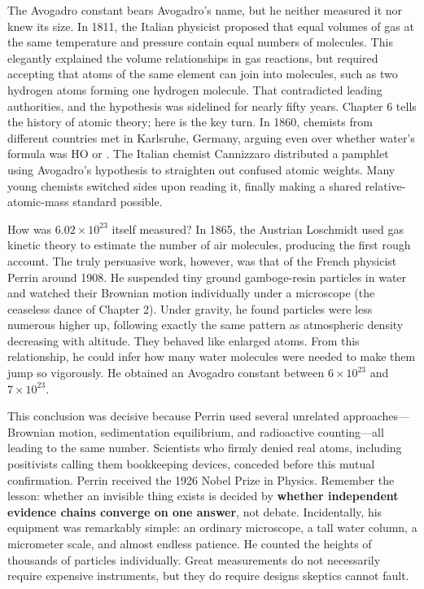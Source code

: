 \begin{zhengju}
The Avogadro constant bears Avogadro's name, but he neither measured it nor knew its size. In 1811, the Italian physicist proposed that equal volumes of gas at the same temperature and pressure contain equal numbers of molecules. This elegantly explained the volume relationships in gas reactions, but required accepting that atoms of the same element can join into molecules, such as two hydrogen atoms forming one hydrogen molecule. That contradicted leading authorities, and the hypothesis was sidelined for nearly fifty years. Chapter 6 tells the history of atomic theory; here is the key turn. In 1860, chemists from different countries met in Karlsruhe, Germany, arguing even over whether water's formula was HO or . The Italian chemist Cannizzaro distributed a pamphlet using Avogadro's hypothesis to straighten out confused atomic weights. Many young chemists switched sides upon reading it, finally making a shared relative-atomic-mass standard possible.

How was $6.02\times 10^{23}$ itself measured? In 1865, the Austrian Loschmidt used gas kinetic theory to estimate the number of air molecules, producing the first rough account. The truly persuasive work, however, was that of the French physicist Perrin around 1908. He suspended tiny ground gamboge-resin particles in water and watched their Brownian motion individually under a microscope (the ceaseless dance of Chapter 2). Under gravity, he found particles were less numerous higher up, following exactly the same pattern as atmospheric density decreasing with altitude. They behaved like enlarged atoms. From this relationship, he could infer how many water molecules were needed to make them jump so vigorously. He obtained an Avogadro constant between $6\times 10^{23}$ and $7\times 10^{23}$.

This conclusion was decisive because Perrin used several unrelated approaches---Brownian motion, sedimentation equilibrium, and radioactive counting---all leading to the same number. Scientists who firmly denied real atoms, including positivists calling them bookkeeping devices, conceded before this mutual confirmation. Perrin received the 1926 Nobel Prize in Physics. Remember the lesson: whether an invisible thing exists is decided by \textbf{whether independent evidence chains converge on one answer}, not debate. Incidentally, his equipment was remarkably simple: an ordinary microscope, a tall water column, a micrometer scale, and almost endless patience. He counted the heights of thousands of particles individually. Great measurements do not necessarily require expensive instruments, but they do require designs skeptics cannot fault.
\end{zhengju}

